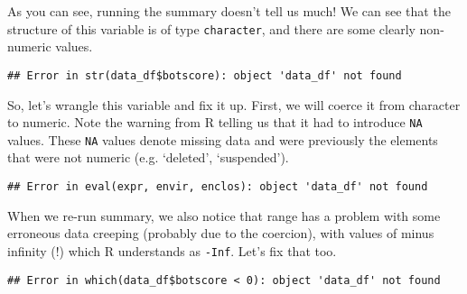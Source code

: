 \documentclass[]{article}
\newenvironment{Shaded}{\begin{snugshade}}{\end{snugshade}}
\newcommand{\DecValTok}[1]{\textcolor[rgb]{0.00,0.00,0.81}{#1}}
\newcommand{\KeywordTok}[1]{\textcolor[rgb]{0.13,0.29,0.53}{\textbf{#1}}}
\newcommand{\NormalTok}[1]{#1}
\newcommand{\OperatorTok}[1]{\textcolor[rgb]{0.81,0.36,0.00}{\textbf{#1}}}
\newcommand{\StringTok}[1]{\textcolor[rgb]{0.31,0.60,0.02}{#1}}
\begin{document}
As you can see, running the summary doesn't tell us much! We can see
that the structure of this variable is of type \texttt{character}, and
there are some clearly non-numeric values.

\begin{Shaded}
\end{Shaded}

\begin{verbatim}
## Error in str(data_df$botscore): object 'data_df' not found
\end{verbatim}

So, let's wrangle this variable and fix it up. First, we will coerce it
from character to numeric. Note the warning from R telling us that it
had to introduce \texttt{NA} values. These \texttt{NA} values denote
missing data and were previously the elements that were not numeric
(e.g. `deleted', `suspended').

\begin{Shaded}
\end{Shaded}

\begin{verbatim}
## Error in eval(expr, envir, enclos): object 'data_df' not found
\end{verbatim}

When we re-run summary, we also notice that range has a problem with
some erroneous data creeping (probably due to the coercion), with values
of minus infinity (!) which R understands as \texttt{-Inf}. Let's fix
that too.

\begin{Shaded}
\end{Shaded}

\begin{verbatim}
## Error in which(data_df$botscore < 0): object 'data_df' not found
\end{verbatim}
\end{document}
